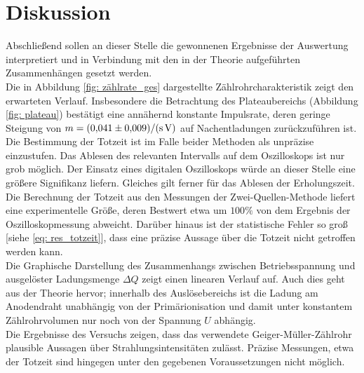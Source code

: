 \section{Diskussion}
Abschließend sollen an dieser Stelle die gewonnenen Ergebnisse der Auswertung interpretiert und
in Verbindung mit den in der Theorie aufgeführten Zusammenhängen gesetzt werden.\\
Die in Abbildung \ref{fig: zählrate_ges} dargestellte Zählrohrcharakteristik zeigt den erwarteten Verlauf. Insbesondere
die Betrachtung des Plateaubereichs (Abbildung \ref{fig: plateau}) bestätigt eine annähernd konstante Impulsrate,
deren geringe Steigung von $m = \SI{0.041 \pm 0.009}{\per\second\per\volt}$ auf Nachentladungen zurückzuführen ist.\\
Die Bestimmung der Totzeit ist im Falle beider Methoden als unpräzise einzustufen. Das Ablesen des relevanten
Intervalls auf dem Oszilloskops ist nur grob möglich. Der Einsatz eines digitalen Oszilloskops würde an dieser %
Stelle eine größere Signifikanz liefern. Gleiches gilt ferner für das Ablesen der Erholungszeit. %
Die Berechnung der Totzeit aus den Messungen der Zwei-Quellen-Methode liefert eine experimentelle Größe, deren Bestwert etwa um
$100\%$ von dem Ergebnis der Oszilloskopmessung abweicht. Darüber hinaus ist der statistische Fehler so groß
[siehe \eqref{eq: res_totzeit}], dass eine präzise Aussage über die Totzeit nicht getroffen werden kann.\\ %
Die Graphische Darstellung des Zusammenhangs zwischen Betriebsspannung und ausgelöster Ladungsmenge $\Delta Q$ zeigt
einen linearen Verlauf auf. Auch dies geht aus der Theorie hervor; innerhalb des Auslösebereichs ist die
Ladung am Anodendraht unabhängig von der Primärionisation und damit unter konstantem Zählrohrvolumen nur noch
von der Spannung $U$ abhängig. \\
Die Ergebnisse des Versuchs zeigen, dass das verwendete Geiger-Müller-Zählrohr plausible Aussagen über Strahlungsintensitäten
zulässt. Präzise Messungen, etwa der Totzeit sind hingegen unter den gegebenen Voraussetzungen nicht möglich.
